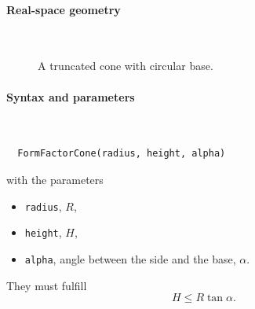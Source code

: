 \paragraph{Real-space geometry}\strut\\

\begin{figure}[H]
\hfill
{}
\hfill
{}
\hfill
{}
\hfill
\caption{A truncated cone with circular base.}
\end{figure}

\paragraph{Syntax and parameters}\strut\\[-2ex plus .2ex minus .2ex]
\begin{lstlisting}
  FormFactorCone(radius, height, alpha)
\end{lstlisting}
with the parameters
\begin{itemize}
\item \texttt{radius}, $R$,
\item \texttt{height}, $H$,
\item \texttt{alpha}, angle between the side and the base, $\alpha$.
\end{itemize}
They must fulfill
\begin{displaymath}
  H\le R\tan\alpha.
\end{displaymath}

